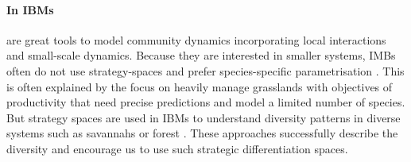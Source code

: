 

\paragraph{In IBMs}

 are great tools to model community dynamics incorporating local interactions and small-scale dynamics. Because they are interested in smaller systems, IMBs often do not use strategy-spaces and prefer species-specific parametrisation \parencite{soussana_gemini:_2012, taubert_modelling_2014, lohier_analyse_2016}. This is often explained by the focus on heavily manage grasslands with objectives of productivity that need precise predictions and model a limited number of species. But strategy spaces are used in IBMs to understand diversity patterns in diverse systems such as savannahs \parencite{reineking_environmental_2006} or forest \parencite{falster_plant:_2016}. These approaches successfully describe the diversity and encourage us to use such strategic differentiation spaces.

